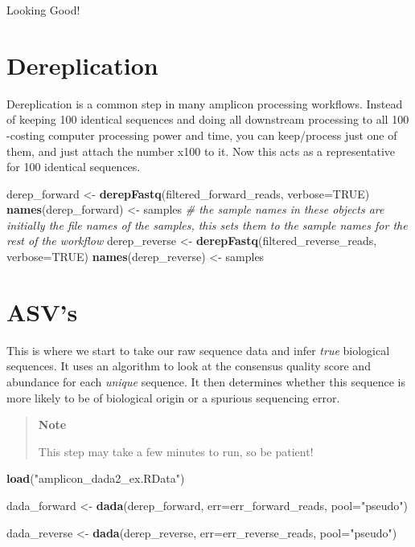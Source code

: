 \documentclass[
]{book}
\newenvironment{Shaded}{\begin{snugshade}}{\end{snugshade}}
\newcommand{\AttributeTok}[1]{\textcolor[rgb]{0.13,0.29,0.53}{#1}}
\newcommand{\CommentTok}[1]{\textcolor[rgb]{0.56,0.35,0.01}{\textit{#1}}}
\newcommand{\ConstantTok}[1]{\textcolor[rgb]{0.56,0.35,0.01}{#1}}
\newcommand{\FunctionTok}[1]{\textcolor[rgb]{0.13,0.29,0.53}{\textbf{#1}}}
\newcommand{\NormalTok}[1]{#1}
\newcommand{\OtherTok}[1]{\textcolor[rgb]{0.56,0.35,0.01}{#1}}
\newcommand{\StringTok}[1]{\textcolor[rgb]{0.31,0.60,0.02}{#1}}
\begin{document}
Looking Good!

\hypertarget{dereplication}{%
\section{Dereplication}\label{dereplication}}

Dereplication is a common step in many amplicon processing workflows. Instead of keeping 100 identical sequences and doing all downstream processing to all 100 -costing computer processing power and time, you can keep/process just one of them, and just attach the number x100 to it. Now this acts as a representative for 100 identical sequences.

\begin{Shaded}
\begin{Highlighting}[]
\NormalTok{derep\_forward }\OtherTok{\textless{}{-}} \FunctionTok{derepFastq}\NormalTok{(filtered\_forward\_reads, }\AttributeTok{verbose=}\ConstantTok{TRUE}\NormalTok{)}
\FunctionTok{names}\NormalTok{(derep\_forward) }\OtherTok{\textless{}{-}}\NormalTok{ samples }\CommentTok{\# the sample names in these objects are initially the file names of the samples, this sets them to the sample names for the rest of the workflow}
\NormalTok{derep\_reverse }\OtherTok{\textless{}{-}} \FunctionTok{derepFastq}\NormalTok{(filtered\_reverse\_reads, }\AttributeTok{verbose=}\ConstantTok{TRUE}\NormalTok{)}
\FunctionTok{names}\NormalTok{(derep\_reverse) }\OtherTok{\textless{}{-}}\NormalTok{ samples}
\end{Highlighting}
\end{Shaded}

\hypertarget{asvs}{%
\section{ASV's}\label{asvs}}

This is where we start to take our raw sequence data and infer \emph{true} biological sequences.
It uses an algorithm to look at the consensus quality score and abundance for each \emph{unique} sequence. It then determines whether this sequence is more likely to be of biological origin or a spurious sequencing error.

\begin{quote}
\textbf{Note}

This step may take a few minutes to run, so be patient!
\end{quote}

\begin{Shaded}
\begin{Highlighting}[]
\FunctionTok{load}\NormalTok{(}\StringTok{"amplicon\_dada2\_ex.RData"}\NormalTok{)}

\NormalTok{dada\_forward }\OtherTok{\textless{}{-}} \FunctionTok{dada}\NormalTok{(derep\_forward, }\AttributeTok{err=}\NormalTok{err\_forward\_reads, }\AttributeTok{pool=}\StringTok{"pseudo"}\NormalTok{)}

\NormalTok{dada\_reverse }\OtherTok{\textless{}{-}} \FunctionTok{dada}\NormalTok{(derep\_reverse, }\AttributeTok{err=}\NormalTok{err\_reverse\_reads, }\AttributeTok{pool=}\StringTok{"pseudo"}\NormalTok{)}
\end{Highlighting}
\end{Shaded}
\end{document}
